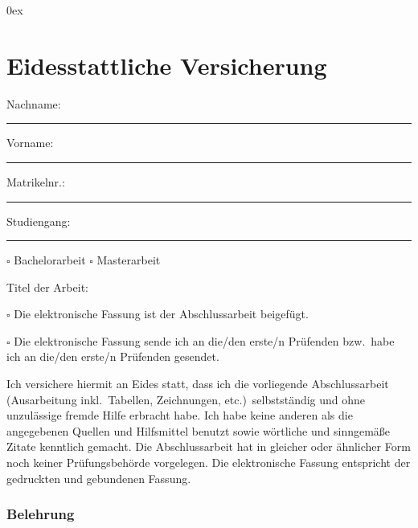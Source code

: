 \begin{small}

  \parindent0ex

  \chapter*{Eidesstattliche Versicherung}

  \thispagestyle{empty}

  \bigskip

  Nachname: \parbox[t]{.343\linewidth}{\rule[-3pt]{\linewidth}{.4pt}} \hspace{2ex} Vorname: \parbox[t]{.35\linewidth}{\rule[-3pt]{\linewidth}{.4pt}}

  \vspace{2\bigskipamount}

  Matrikelnr.: \parbox[t]{.15\linewidth}{\rule[-3pt]{\linewidth}{.4pt}} \hspace{2ex} Studiengang: \parbox[t]{.5\linewidth}{\rule[-3pt]{\linewidth}{.4pt}}

  \bigskip

  $\square$ Bachelorarbeit \hspace{1ex} $\square$ Masterarbeit

  \bigskip

  Titel der Arbeit: \Title

  \bigskip

  $\square$ Die elektronische Fassung ist der Abschlussarbeit beigefügt.

  \bigskip

  $\square$ Die elektronische Fassung sende ich an die/den erste/n Prüfenden bzw.~habe ich an die/den erste/n Prüfenden gesendet.

  \bigskip

  Ich versichere hiermit an Eides statt, dass ich die vorliegende Abschlussarbeit (Ausarbeitung inkl.~Tabellen, Zeichnungen, etc.)~selbstständig und ohne unzulässige fremde Hilfe erbracht habe.
  Ich habe keine anderen als die angegebenen Quellen und Hilfsmittel benutzt sowie wörtliche und sinngemäße Zitate kenntlich gemacht.
  Die Abschlussarbeit hat in gleicher oder ähnlicher Form noch keiner Prüfungsbehörde vorgelegen.
  Die elektronische Fassung entspricht der gedruckten und gebundenen Fassung.

  \subsection*{Belehrung}


\end{small}
